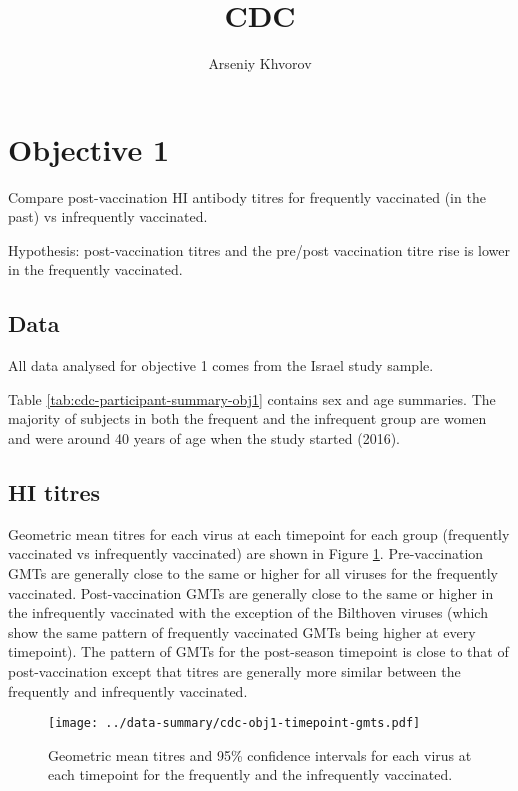 \documentclass[12pt]{article}
\title{CDC}
\author{Arseniy Khvorov}
\begin{document}
\maketitle

\section{Objective 1}

Compare post-vaccination HI antibody titres for frequently vaccinated (in the past) vs infrequently vaccinated.

Hypothesis: post-vaccination titres and the pre/post vaccination titre rise
is lower in the frequently vaccinated.

\subsection{Data}

All data analysed for objective 1 comes from the Israel study sample.

Table \ref{tab:cdc-participant-summary-obj1} contains sex and age summaries.
The majority of subjects in both the frequent and the infrequent group are
women and were around 40 years of age when the study started (2016).



\subsection{HI titres}

Geometric mean titres for each virus at each timepoint for each group (frequently
vaccinated vs infrequently vaccinated) are shown in Figure
\ref{fig:cdc-obj1-timepoint-gmts}.
Pre-vaccination GMTs are generally close to the same
or higher for all viruses for the frequently vaccinated.
Post-vaccination GMTs are generally close to the same or higher in the infrequently vaccinated with
the exception of the Bilthoven viruses (which show the same pattern
of frequently vaccinated GMTs being higher at every
timepoint). The pattern of GMTs for the post-season timepoint is close to that
of post-vaccination except that titres are generally more similar between the
frequently and infrequently vaccinated.

\begin{figure}
	\texttt{[image: ../data-summary/cdc-obj1-timepoint-gmts.pdf]}
	\caption{Geometric mean titres and 95\% confidence intervals for each virus at each timepoint for the frequently and the infrequently vaccinated.}
	\label{fig:cdc-obj1-timepoint-gmts}
\end{figure}
\end{document}
